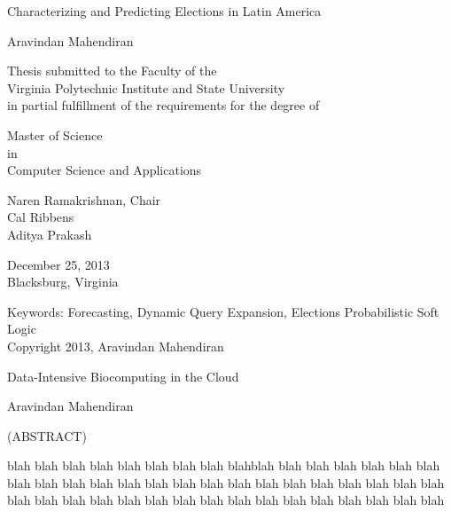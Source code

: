 \documentclass[12pt]{report}
\begin{document}
\singlespacing

\thispagestyle{empty}
\begin{center}

{\Large 
Characterizing and Predicting Elections in Latin America
}

\vfill

Aravindan Mahendiran

\vfill

Thesis submitted to the Faculty of the \\
Virginia Polytechnic Institute and State University \\
in partial fulfillment of the requirements for the degree of

\vfill

Master of Science \\
in \\
Computer Science and Applications

\vfill

Naren Ramakrishnan, Chair \\
Cal Ribbens \\
Aditya Prakash

\vfill

December 25, 2013 \\
Blacksburg, Virginia

\vfill

Keywords: Forecasting, Dynamic Query Expansion, Elections Probabilistic Soft Logic \\
Copyright 2013, Aravindan Mahendiran

\end{center}

\pagebreak

\thispagestyle{empty}
\begin{center}

{\large Data-Intensive Biocomputing in the Cloud}

\vfill

Aravindan Mahendiran

\vfill

(ABSTRACT)

\vfill

\end{center}

blah blah blah blah blah blah blah blah blahblah blah blah blah blah blah blah blah blah blah blah blah blah blah blah blah blah blah blah blah blah
blah blah blah blah blah blah blah blah blah blah blah blah blah blah blah blah blah blah
\end{document}
